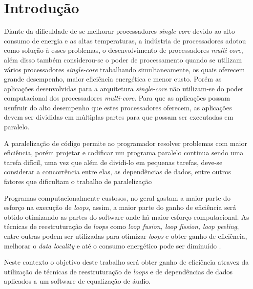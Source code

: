 \chapter{Introdução}

Diante da  dificuldade de se melhorar processadores \textit{single-core} devido 
ao alto consumo de energia e as altas temperaturas, a indústria de processadores 
adotou como solução à esses problemas, o desenvolvimento de processadores 
\textit{multi-core}, além disso também considerou-se o poder de processamento 
quando se utilizam vários processadores \textit{single-core} trabalhando 
simultaneamente, os quais oferecem grande desempenho, maior eficiência energética 
e menor custo.
Porém as aplicações desenvolvidas para a arquitetura \textit{single-core} não 
utilizam-se do poder computacional dos processadores \textit{multi-core}.
Para que as aplicações possam usufruir do alto desempenho que estes processadores 
oferecem, as aplicações devem ser divididas em múltiplas partes para que possam 
ser executadas em paralelo.

A paralelização de código permite ao programador resolver problemas com maior 
eficiência, porém projetar e codificar um programa paralelo continua sendo uma 
tarefa difícil, uma vez que além de dividi-lo em pequenas tarefas, deve-se 
considerar a concorrência entre elas, as dependências de dados, entre outros 
fatores que dificultam o trabalho de paralelização 

Programas computacionalmente custosos, no geral gastam a maior parte do esforço 
na execução de \textit{loops}, assim, a maior parte do ganho de eficiência será
obtido otimizando as partes do software onde há maior esforço computacional.
As técnicas de reestruturação de \textit{loops} como \textit{loop 
fusion, loop fission, loop peeling}, entre outras podem ser utilizadas para
otimizar \textit{loops} e obter ganho de eficiência, melhorar o \textit{data
locality} e até o consumo energético pode ser diminuído \cite{Liu:2004}.

Neste contexto o objetivo deste trabalho será obter ganho de eficiência atravez da 
utilização de técnicas de reestruturação de \textit{loops} e de dependências de 
dados aplicados a um software de equalização de áudio.
